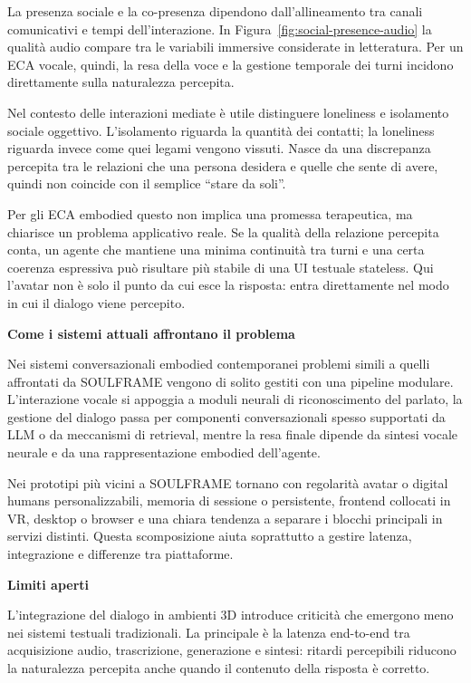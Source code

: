 La presenza sociale e la co-presenza dipendono dall'allineamento tra canali comunicativi e tempi dell'interazione. In Figura~\ref{fig:social-presence-audio} la qualità audio compare tra le variabili immersive considerate in letteratura. Per un ECA vocale, quindi, la resa della voce e la gestione temporale dei turni incidono direttamente sulla naturalezza percepita.

Nel contesto delle interazioni mediate è utile distinguere loneliness e isolamento sociale oggettivo. L'isolamento riguarda la quantità dei contatti; la loneliness riguarda invece come quei legami vengono vissuti. Nasce da una discrepanza percepita tra le relazioni che una persona desidera e quelle che sente di avere, quindi non coincide con il semplice ``stare da soli''.\cite{HawkleyCacioppo2010}

Per gli ECA embodied questo non implica una promessa terapeutica, ma chiarisce un problema applicativo reale. Se la qualità della relazione percepita conta, un agente che mantiene una minima continuità tra turni e una certa coerenza espressiva può risultare più stabile di una UI testuale stateless.\cite{Oh2018SocialPresence} Qui l'avatar non è solo il punto da cui esce la risposta: entra direttamente nel modo in cui il dialogo viene percepito.

\medskip
\noindent\textbf{Come i sistemi attuali affrontano il problema}
\par
Nei sistemi conversazionali embodied contemporanei problemi simili a quelli affrontati da SOULFRAME vengono di solito gestiti con una pipeline modulare. L'interazione vocale si appoggia a moduli neurali di riconoscimento del parlato, la gestione del dialogo passa per componenti conversazionali spesso supportati da LLM o da meccanismi di retrieval, mentre la resa finale dipende da sintesi vocale neurale e da una rappresentazione embodied dell'agente.\cite{Yin2023VoiceVR,Lewis2020RAG}

Nei prototipi più vicini a SOULFRAME tornano con regolarità avatar o digital humans personalizzabili, memoria di sessione o persistente, frontend collocati in VR, desktop o browser e una chiara tendenza a separare i blocchi principali in servizi distinti. Questa scomposizione aiuta soprattutto a gestire latenza, integrazione e differenze tra piattaforme.

\medskip
\noindent\textbf{Limiti aperti}
\par
L'integrazione del dialogo in ambienti 3D introduce criticità che emergono meno nei sistemi testuali tradizionali. La principale è la latenza end-to-end tra acquisizione audio, trascrizione, generazione e sintesi: ritardi percepibili riducono la naturalezza percepita anche quando il contenuto della risposta è corretto.

